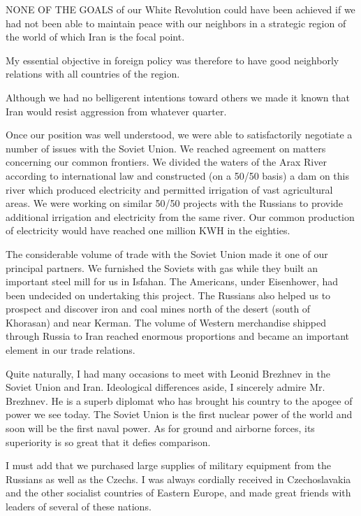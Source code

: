 NONE OF THE GOALS of our White Revolution could have been achieved if we had not been able to maintain peace with our neighbors in a strategic region of the world of which Iran is the focal point. 

My essential objective in foreign policy was therefore to have good neighborly relations with all countries of the region. 

Although we had no belligerent intentions toward others we made it known that Iran would resist aggression from whatever quarter. 

Once our position was well understood, we were able to satisfactorily negotiate a number of issues with the Soviet Union. We reached agreement on matters concerning our common frontiers. We divided the waters of the Arax River according to international law and constructed (on a 50/50 basis) a dam on this river which produced electricity and permitted irrigation of vast agricultural areas. We were working on similar 50/50 projects with the Russians to provide additional irrigation and electricity from the same river. Our common production of electricity would have reached one million KWH in the eighties. 

The considerable volume of trade with the Soviet Union made it one of our principal partners. We furnished the Soviets with gas while they built an important steel mill for us in Isfahan. The Americans, under Eisenhower, had been undecided on undertaking this project. The Russians also helped us to prospect and discover iron and coal mines north of the desert (south of Khorasan) and near Kerman. The volume of Western merchandise shipped through Russia to Iran reached enormous proportions and became an important element in our trade relations. 

Quite naturally, I had many occasions to meet with Leonid Brezhnev in the Soviet Union and Iran. Ideological differences aside, I sincerely admire Mr. Brezhnev. He is a superb diplomat who has brought his country to the apogee of power we see today. The Soviet Union is the first nuclear power of the world and soon will be the first naval power. As for ground and airborne forces, its superiority is so great that it defies comparison. 

I must add that we purchased large supplies of military equipment from the Russians as well as the Czechs. I was always cordially received in Czechoslavakia and the other socialist countries of Eastern Europe, and made great friends with leaders of several of these nations. 

